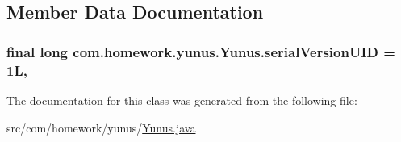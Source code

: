 \subsection{Member Data Documentation}
\subsubsection[{\texorpdfstring{serial\+Version\+U\+ID}{serialVersionUID}}]{\setlength{\rightskip}{0pt plus 5cm}final long com.\+homework.\+yunus.\+Yunus.\+serial\+Version\+U\+ID = 1L\hspace{0.3cm}{\ttfamily [static]}, {\ttfamily [private]}}\hypertarget{classcom_1_1homework_1_1yunus_1_1_yunus_a135ed76b5ead6a58aa5f941be9477ed1}{}\label{classcom_1_1homework_1_1yunus_1_1_yunus_a135ed76b5ead6a58aa5f941be9477ed1}


The documentation for this class was generated from the following file\+:\begin{DoxyCompactItemize}
\item 
src/com/homework/yunus/\hyperlink{_yunus_8java}{Yunus.\+java}\end{DoxyCompactItemize}

